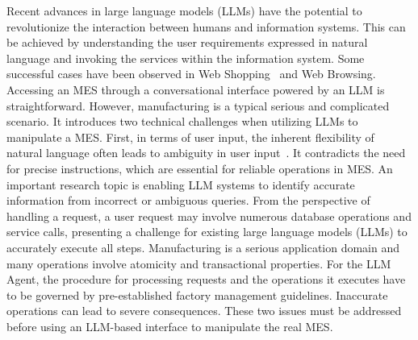 \documentclass[preprint,12pt]{elsarticle}
\begin{document}
Recent advances in large language models (LLMs) have the potential to revolutionize the interaction between humans and information systems.
This can be achieved by understanding the user requirements expressed in natural language and invoking the services within the information system.
Some successful cases have been observed in Web Shopping~\cite{yao2022webshop} and Web Browsing\cite{deng2024mind2web}.
Accessing an MES through a conversational interface powered by an LLM is straightforward. 
However, manufacturing is a typical serious and complicated scenario.
It introduces two technical challenges when utilizing LLMs to manipulate a MES.
First, in terms of user input, the inherent flexibility of natural language often leads to ambiguity in user input~\cite{yadav2021comprehensive}. 
It contradicts the need for precise instructions, which are essential for reliable operations in MES.
An important research topic is enabling LLM systems to identify accurate information from incorrect or ambiguous queries.
From the perspective of handling a request, a user request may involve numerous database operations and service calls, presenting a challenge for existing large language models (LLMs) to accurately execute all steps.
Manufacturing is a serious application domain and many operations involve atomicity and transactional properties. 
For the LLM Agent, the procedure for processing requests and the operations it executes have to be governed by pre-established factory management guidelines. 
Inaccurate operations can lead to severe consequences.
These two issues must be addressed before using an LLM-based interface to manipulate the real MES.
\end{document}
